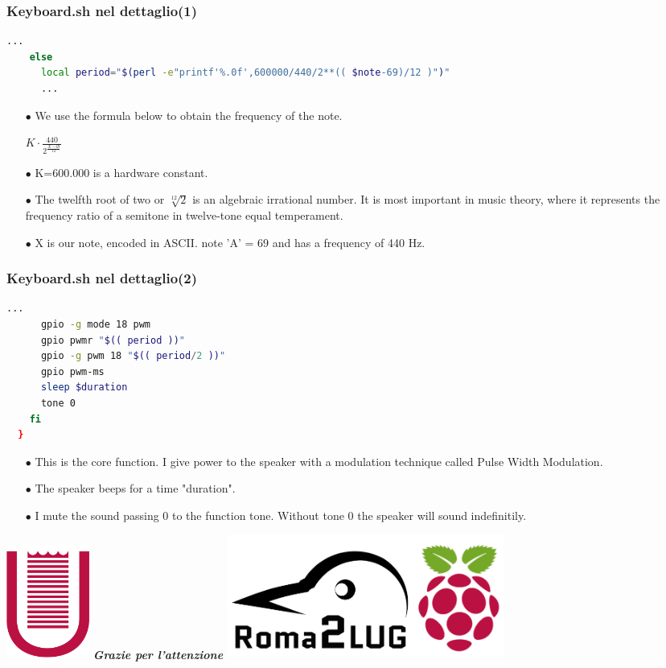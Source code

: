 \documentclass{beamer}
\begin{document}

\begin{frame}[fragile]
	\frametitle{\textbf{Keyboard.sh nel dettaglio(1)}}
  \begin{lstlisting}[language=bash]
    ...
    else
      local period="$(perl -e"printf'%.0f',600000/440/2**(( $note-69)/12 )")"
      ...
  \end{lstlisting}
  \begin{itemize}
  	\item[$\bullet$] We use the formula below to obtain the frequency of the note.
  	
  	\begin{center}
  			$K\cdot\frac{440}{2^{\frac{X-69}{12}}}$
  	\end{center}
  		
  	
  	\item[$\bullet$] K=600.000 is a hardware constant.
  	\item[$\bullet$] 
The twelfth root of two or $\sqrt[12]{2}$ is an algebraic irrational number. It is most important in music theory, where it represents the frequency ratio of a semitone in twelve-tone equal temperament.
  	\item[$\bullet$] X is our note, encoded in ASCII. note 'A' = 69 and has a frequency of 440 Hz.
  \end{itemize}
\end{frame}



\begin{frame}[fragile]
	\frametitle{\textbf{Keyboard.sh nel dettaglio(2)}}
  \begin{lstlisting}[language=bash]
      ...
 	  gpio -g mode 18 pwm
      gpio pwmr "$(( period ))"
      gpio -g pwm 18 "$(( period/2 ))"
      gpio pwm-ms
      sleep $duration
      tone 0
    fi
  }
  \end{lstlisting}
  \begin{itemize}
  \item[$\bullet$] This is the core function. I give power to the speaker with a modulation technique called Pulse Width Modulation.
  \item[$\bullet$] The speaker beeps for a time "duration".
  \item[$\bullet$] I mute the sound passing 0 to the function tone. Without tone 0 the speaker will sound indefinitily.
  \end{itemize}
\end{frame}



\begin{frame}[plain]
\begin{center}
\includegraphics[width=0.12\textwidth]{imgs/logo-uniroma2-red.png}
\vfill
\huge{\textit{\textbf{Grazie per l'attenzione}}}
\vfill
\includegraphics[width=0.40\textwidth]{imgs/logo02.png}
\end{center}
\end{frame}
\end{document}
